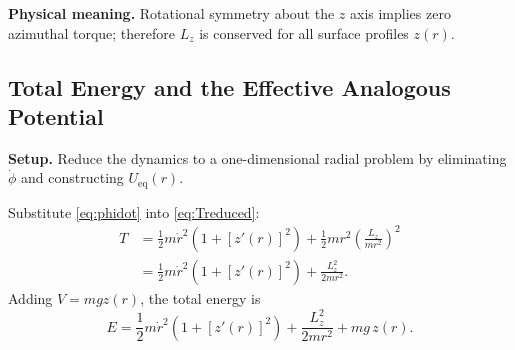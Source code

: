 \documentclass[11pt,letterpaper]{article}
\newcommand{\parhead}[1]{\par\medskip\noindent\textbf{#1}\ignorespaces}
\begin{document}
\parhead{Physical meaning.}
Rotational symmetry about the $z$ axis implies zero azimuthal torque; therefore $L_z$ is conserved for all surface profiles $z(r)$.

\subsection{Total Energy and the Effective Analogous Potential}
\label{sec:Ueq}

\parhead{Setup.}
Reduce the dynamics to a one-dimensional radial problem by eliminating $\dot{\phi}$ and constructing $U_{\mathrm{eq}}(r)$.

Substitute \eqref{eq:phidot} into \eqref{eq:Treduced}:
\begin{align}
    T
    &= \frac{1}{2}m\dot{r}^2\left(1 + [z'(r)]^2\right)
     + \frac{1}{2}m r^2 \left(\frac{L_z}{m r^2}\right)^2 \nonumber \\
    &= \frac{1}{2}m\dot{r}^2\left(1 + [z'(r)]^2\right)
     + \frac{L_z^2}{2m r^2}.
    \label{eq:TwithLz}
\end{align}
Adding $V=mgz(r)$, the total energy is
\begin{equation}\label{eq:energy}
    E = \frac{1}{2}m\dot{r}^2\left(1 + [z'(r)]^2\right)
      + \frac{L_z^2}{2m r^2}
      + mg\,z(r).
\end{equation}
\end{document}
